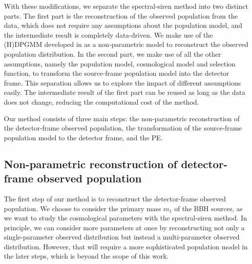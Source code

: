 \documentclass[sn-aps, pdflatex]{sn-jnl}
\begin{document}
With these modifications, we separate the spectral-siren method into two distinct parts.
The first part is the reconstruction of the observed population from the data, which does not require any assumptions about the population model, and the intermediate result is completely data-driven.
We make use of the \ac{(H)DPGMM} developed in \cite{Rinaldi:2021bhm} as a non-parametric model to reconstruct the observed population distribution.
In the second part, we make use of all the other assumptions, namely the population model, cosmological model and selection function, to transform the source-frame population model into the detector frame.
This separation allows us to explore the impact of different assumptions easily.
The intermediate result of the first part can be reused as long as the data does not change, reducing the computational cost of the method.

Our method consists of three main steps: the non-parametric reconstruction of the detector-frame observed population, the transformation of the source-frame population model to the detector frame, and the \ac{PE}.

\subsection{Non-parametric reconstruction of detector-frame observed population}
\label{sec:reconstruction}

The first step of our method is to reconstruct the detector-frame observed population.
We choose to consider the primary mass $m_1$ of the \ac{BBH} sources, as we want to study the cosmological parameters with the spectral-siren method.
In principle, we can consider more parameters at once by reconstructing not only a single-parameter observed distribution but instead a multi-parameter observed distribution.
However, that will require a more sophisticated population model in the later steps, which is beyond the scope of this work.
\end{document}
